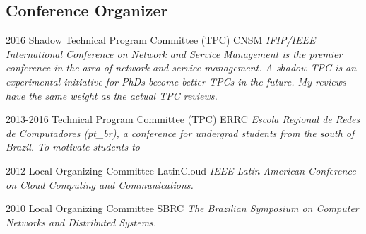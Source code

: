 \documentclass[print]{styles/friggeri-cv-linux} %
\begin{document}
\subsection{Conference Organizer}\vspace{-5pt}

\begin{entrylist}
\entry
{2016} 
{Shadow Technical Program Committee (TPC)}
{CNSM}
{\textit{IFIP/IEEE International Conference on Network and Service Management is
the premier conference in the area of network and service management. A shadow
TPC is an experimental initiative for PhDs become better TPCs in the future. My
reviews have the same weight as the actual TPC reviews.}}

\entry
{2013-2016} 
{Technical Program Committee (TPC)}
{ERRC}
{\textit{Escola Regional de Redes de Computadores (pt\_br), a conference for
undergrad students from the south of Brazil. To motivate students to }}

\entry
{2012} 
{Local Organizing Committee}
{LatinCloud}
{\textit{IEEE Latin American Conference on Cloud Computing and Communications.}}

\entry
{2010}
{Local Organizing Committee}
{SBRC}
{\textit{The Brazilian Symposium on Computer Networks and Distributed Systems.}}

\end{entrylist}


\end{document}
